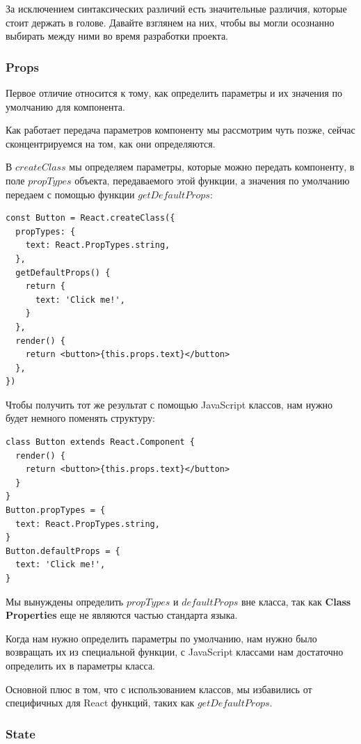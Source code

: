 За исключением синтаксических различий есть значительные различия, которые стоит держать в голове. Давайте взглянем на них, чтобы вы могли осознанно выбирать между ними во время разработки проекта.

\subsubsection{Props}

Первое отличие относится к тому, как определить параметры и их значения по умолчанию для компонента.

Как работает передача параметров компоненту мы рассмотрим чуть позже, сейчас сконцентрируемся на том, как они определяются.

В $createClass$ мы определяем параметры, которые можно передать компоненту, в поле $propTypes$ объекта, передаваемого этой функции, а значения по умолчанию передаем с помощью функции $getDefaultProps$:

\begin{lstlisting}
const Button = React.createClass({
  propTypes: {
    text: React.PropTypes.string,
  },
  getDefaultProps() {
    return {
      text: 'Click me!',
    }
  },
  render() {
    return <button>{this.props.text}</button>
  }, 
})
\end{lstlisting}

Чтобы получить тот же результат с помощью JavaScript классов, нам нужно будет немного поменять структуру:

\begin{lstlisting}
class Button extends React.Component {
  render() {
    return <button>{this.props.text}</button>
  }
}
Button.propTypes = {
  text: React.PropTypes.string,
}
Button.defaultProps = {
  text: 'Click me!',
}
\end{lstlisting}

Мы вынуждены определить $propTypes$ и $defaultProps$ вне класса, так как \textbf{Class Properties} еще не являются частью стандарта языка.

Когда нам нужно определить параметры по умолчанию, нам нужно было возвращать их из специальной функции, с JavaScript классами нам достаточно определить их в параметры класса.

Основной плюс в том, что с использованием классов, мы избавились от специфичных для React функций, таких как $getDefaultProps$.

\subsubsection{State}


